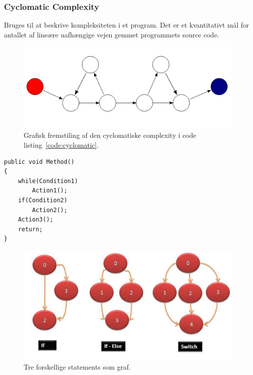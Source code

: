 \subsubsection{Cyclomatic Complexity}\label{sec:cyclomatic}
Bruges til at beskrive kompleksiteten i et program. Det er et kvantitativt mål for antallet af lineære uafhængige vejen gemmet programmets source code.

%
%
%
%

\begin{figure}[H]
	\centering
	\includegraphics[width=0.8\linewidth]{figs/cyclomatic}
	\caption{Grafisk fremstiling af den cyclomatiske complexity i code listing~\ref{code:cyclomatic}.}
	\label{fig:cyclomatic}
\end{figure}

\begin{lstlisting}[caption=Kode for eksempel vist på figur~\ref{fig:cyclomatic}.,label=code:cyclomatic]
public void Method()
{
	while(Condition1) 
		Action1();		
	if(Condition2) 
		Action2();		
	Action3();	
	return;
}
\end{lstlisting}

\begin{figure}[H]
\centering
\includegraphics[width=0.8\linewidth]{figs/statementsgraph}
\caption{Tre forskellige statements som graf.}
\label{fig:statementsgraph}
\end{figure}


